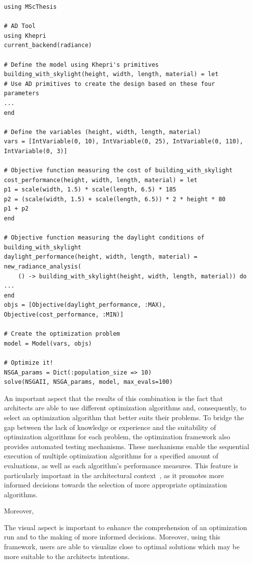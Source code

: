 \begin{lstlisting}[caption={BPO example of the framework's API using the Khepri AD tool.},label=BPOjuliaCode]	
using MScThesis

# AD Tool
using Khepri 
current_backend(radiance)

# Define the model using Khepri's primitives
building_with_skylight(height, width, length, material) = let
# Use AD primitives to create the design based on these four parameters
...
end

# Define the variables (height, width, length, material)
vars = [IntVariable(0, 10), IntVariable(0, 25), IntVariable(0, 110), IntVariable(0, 3)]

# Objective function measuring the cost of building_with_skylight
cost_performance(height, width, length, material) = let
p1 = scale(width, 1.5) * scale(length, 6.5) * 185
p2 = (scale(width, 1.5) + scale(length, 6.5)) * 2 * height * 80
p1 + p2
end

# Objective function measuring the daylight conditions of building_with_skylight
daylight_performance(height, width, length, material) = 
new_radiance_analysis(
	() -> building_with_skylight(height, width, length, material)) do
...
end
objs = [Objective(daylight_performance, :MAX), Objective(cost_performance, :MIN)]

# Create the optimization problem
model = Model(vars, objs)

# Optimize it!
NSGA_params = Dict(:population_size => 10)
solve(NSGAII, NSGA_params, model, max_evals=100)
\end{lstlisting}

An important aspect that the results of this combination is the fact that architects are able to use different optimization algorithms and, consequently, to select an optimization algorithm that better suits their problems. To bridge the gap between the lack of knowledge or experience and the suitability of optimization algorithms for each problem, the optimization framework also provides automated testing mechanisms. These mechanisms enable the sequential execution of multiple optimization algorithms for a specified amount of evaluations, as well as each algorithm's performance measures. This feature is particularly important in the architectural context~\cite{Wortmann2016BBO,Hamdy2016}, as it promotes more informed decisions towards the selection of more appropriate optimization algorithms.

Moreover,


The visual aspect is important to enhance the comprehension of an optimization run and to the making of more informed decisions. Moreover, using this framework, users are able to visualize close to optimal solutions which may be more suitable to the architects intentions. 


